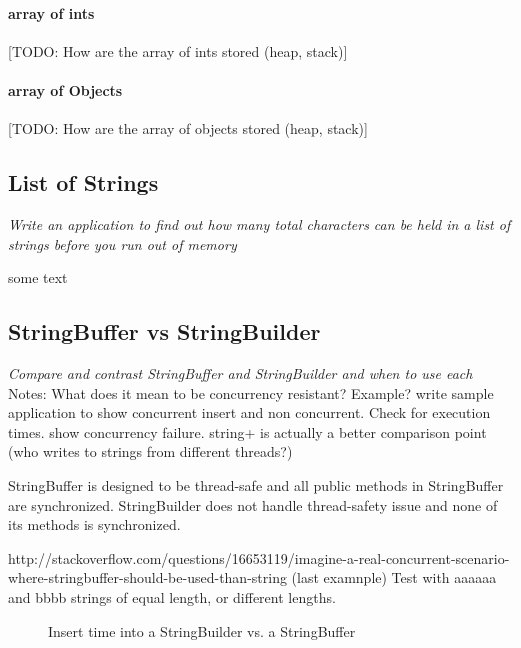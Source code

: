 \paragraph{array of ints}
[TODO: How are the array of ints stored (heap, stack)]
\paragraph{array of Objects}
[TODO: How are the array of objects stored (heap, stack)]


\subsection{List of Strings}
\textit{Write an application to find out how many total characters can be held in a list of strings before you run out of memory}

some text



\subsection{StringBuffer vs StringBuilder}
\textit{Compare and contrast StringBuffer and StringBuilder and when to use each}
Notes: What does it mean to be concurrency resistant? Example? write sample application to show concurrent insert and non concurrent. Check for execution times. show concurrency failure. string+ is actually a better comparison point (who writes to strings from different threads?)

StringBuffer is designed to be thread-safe and all public methods in StringBuffer are synchronized. StringBuilder does not handle thread-safety issue and none of its methods is synchronized.

http://stackoverflow.com/questions/16653119/imagine-a-real-concurrent-scenario-where-stringbuffer-should-be-used-than-string (last examnple) Test with aaaaaa and bbbb strings of equal length, or different lengths.


\begin{figure}[H]\centering
{}\caption{Insert time into a StringBuilder vs. a StringBuffer}
\label{fig:stringbuildervsStringBuffer}
\end{figure}

